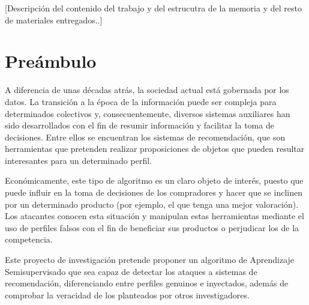 
[Descripción del contenido del trabajo y del estrucutra de la memoria y del resto de materiales entregados..]


\section{Preámbulo}

A diferencia de unas décadas atrás, la sociedad actual está gobernada por los datos. La transición a la época de la información puede ser compleja para determinados colectivos y, consecuentemente, diversos sistemas auxiliares han sido desarrollados con el fin de resumir información y facilitar la toma de decisiones. Entre ellos se encuentran los sistemas de recomendación, que son herramientas que pretenden realizar proposiciones de objetos que pueden resultar interesantes para un determinado perfil.

Económicamente, este tipo de algoritmo es un claro objeto de interés, puesto que puede influir en la toma de decisiones de los compradores y hacer que se inclinen por un determinado producto (por ejemplo, el que tenga una mejor valoración). Los atacantes conocen esta situación y manipulan estas herramientas mediante el uso de perfiles falsos con el fin de beneficiar sus productos o perjudicar los de la competencia.

Este proyecto de investigación pretende proponer un algoritmo de Aprendizaje Semisupervisado que sea capaz de detectar los ataques a sistemas de recomendación, diferenciando entre perfiles genuinos e inyectados, además de comprobar la veracidad de los planteados por otros investigadores.



